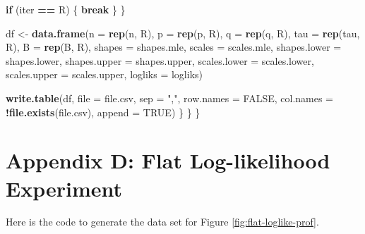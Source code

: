 \documentclass[
]{article}
\newenvironment{Shaded}{\begin{snugshade}}{\end{snugshade}}
\newcommand{\ControlFlowTok}[1]{\textcolor[rgb]{0.13,0.29,0.53}{\textbf{#1}}}
\newcommand{\DataTypeTok}[1]{\textcolor[rgb]{0.13,0.29,0.53}{#1}}
\newcommand{\KeywordTok}[1]{\textcolor[rgb]{0.13,0.29,0.53}{\textbf{#1}}}
\newcommand{\NormalTok}[1]{#1}
\newcommand{\OperatorTok}[1]{\textcolor[rgb]{0.81,0.36,0.00}{\textbf{#1}}}
\newcommand{\OtherTok}[1]{\textcolor[rgb]{0.56,0.35,0.01}{#1}}
\newcommand{\StringTok}[1]{\textcolor[rgb]{0.31,0.60,0.02}{#1}}
\begin{document}
\begin{Shaded}
\begin{Highlighting}[]
                \ControlFlowTok{if}\NormalTok{ (iter }\OperatorTok{==}\StringTok{ }\NormalTok{R) \{}
                  \ControlFlowTok{break}
\NormalTok{                \}}
\NormalTok{            \}}

\NormalTok{            df \textless{}{-}}\StringTok{ }\KeywordTok{data.frame}\NormalTok{(}\DataTypeTok{n =} \KeywordTok{rep}\NormalTok{(n, R), }\DataTypeTok{p =} \KeywordTok{rep}\NormalTok{(p, R), }\DataTypeTok{q =} \KeywordTok{rep}\NormalTok{(q,}
\NormalTok{                R), }\DataTypeTok{tau =} \KeywordTok{rep}\NormalTok{(tau, R), }\DataTypeTok{B =} \KeywordTok{rep}\NormalTok{(B, R), }\DataTypeTok{shapes =}\NormalTok{ shapes.mle,}
                \DataTypeTok{scales =}\NormalTok{ scales.mle, }\DataTypeTok{shapes.lower =}\NormalTok{ shapes.lower,}
                \DataTypeTok{shapes.upper =}\NormalTok{ shapes.upper, }\DataTypeTok{scales.lower =}\NormalTok{ scales.lower,}
                \DataTypeTok{scales.upper =}\NormalTok{ scales.upper, }\DataTypeTok{logliks =}\NormalTok{ logliks)}

            \KeywordTok{write.table}\NormalTok{(df, }\DataTypeTok{file =}\NormalTok{ file.csv, }\DataTypeTok{sep =} \StringTok{","}\NormalTok{, }\DataTypeTok{row.names =} \OtherTok{FALSE}\NormalTok{,}
                \DataTypeTok{col.names =} \OperatorTok{!}\KeywordTok{file.exists}\NormalTok{(file.csv), }\DataTypeTok{append =} \OtherTok{TRUE}\NormalTok{)}
\NormalTok{        \}}
\NormalTok{    \}}
\NormalTok{\}}
\end{Highlighting}
\end{Shaded}

\hypertarget{appendix-d-flat-log-likelihood-experiment}{%
\section*{Appendix D: Flat Log-likelihood
Experiment}\label{appendix-d-flat-log-likelihood-experiment}}

\label{app:flat-like_code} Here is the code to generate the data set for
Figure \ref{fig:flat-loglike-prof}.
\end{document}
